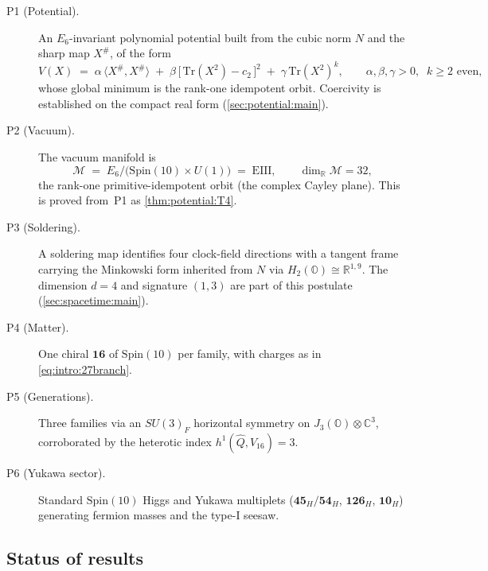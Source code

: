 \begin{description}
  \item[\textnormal{P1} (Potential).] An $E_6$-invariant polynomial potential
    built from the cubic norm $N$ and the sharp map $X^{\#}$, of the form
    \begin{equation}
      V(X)\;=\;\alpha\,\langle X^{\#},X^{\#}\rangle
        \;+\;\beta\,\bigl[\,\mathrm{Tr}(X^{2})-c_2\,\bigr]^{2}
        \;+\;\gamma\,\mathrm{Tr}(X^{2})^{k},
      \qquad \alpha,\beta,\gamma>0,\;\; k\ge 2 \text{ even},
      \label{eq:intro:V}
    \end{equation}
    whose global minimum is the rank-one idempotent orbit. Coercivity is
    established on the compact real form (\autoref{sec:potential:main}).
  \item[\textnormal{P2} (Vacuum).] The vacuum manifold is
    \begin{equation}
      \mathcal{M}\;=\;E_6/\bigl(\mathrm{Spin}(10)\times U(1)\bigr)\;=\;\mathrm{EIII},
      \qquad \dim_{\mathbb{R}}\mathcal{M}=32,
      \label{eq:intro:vacuum}
    \end{equation}
    the rank-one primitive-idempotent orbit (the complex Cayley plane). This is
    proved from~\textnormal{P1} as \autoref{thm:potential:T4}.
  \item[\textnormal{P3} (Soldering).] A soldering map identifies four
    clock-field directions with a tangent frame carrying the Minkowski form
    inherited from $N$ via $H_2(\mathbb{O})\cong\mathbb{R}^{1,9}$. The
    dimension $d=4$ and signature $(1,3)$ are part of this postulate
    (\autoref{sec:spacetime:main}).
  \item[\textnormal{P4} (Matter).] One chiral $\mathbf{16}$ of
    $\mathrm{Spin}(10)$ per family, with charges as in
    \eqref{eq:intro:27branch}.
  \item[\textnormal{P5} (Generations).] Three families via an $SU(3)_F$
    horizontal symmetry on $J_3(\mathbb{O})\otimes\mathbb{C}^{3}$, corroborated
    by the heterotic index $h^{1}(\hat Q,V_{16})=3$.
  \item[\textnormal{P6} (Yukawa sector).] Standard $\mathrm{Spin}(10)$ Higgs and
    Yukawa multiplets ($\mathbf{45}_H/\mathbf{54}_H$, $\mathbf{126}_H$,
    $\mathbf{10}_H$) generating fermion masses and the type-I seesaw.
\end{description}

\subsection{Status of results}
\label{sec:intro:convention}

